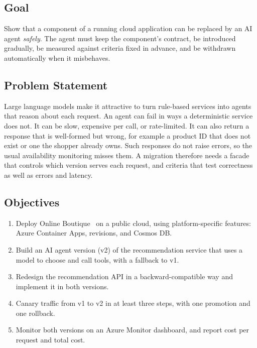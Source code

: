 \documentclass[conference]{IEEEtran}
\begin{document}
\subsection{Goal}
Show that a component of a running cloud application can be replaced by an
AI agent \emph{safely}. The agent must keep the component's contract, be
introduced gradually, be measured against criteria fixed in advance, and be
withdrawn automatically when it misbehaves.

\subsection{Problem Statement}
Large language models make it attractive to turn rule-based services into
agents that reason about each request. An agent can fail in ways a
deterministic service does not. It can be slow, expensive per call, or
rate-limited. It can also return a response that is well-formed but wrong,
for example a product ID that does not exist or one the shopper already
owns. Such responses do not raise errors, so the usual availability
monitoring misses them. A migration therefore needs a facade that controls
which version serves each request, and criteria that test correctness as
well as errors and latency.

\subsection{Objectives}
\begin{enumerate}
\item Deploy Online Boutique~\cite{boutique} on a public cloud, using
platform-specific features: Azure Container Apps, revisions, and Cosmos DB.
\item Build an AI agent version (v2) of the recommendation service that
uses a model to choose and call tools, with a fallback to v1.
\item Redesign the recommendation API in a backward-compatible way and
implement it in both versions.
\item Canary traffic from v1 to v2 in at least three steps, with one
promotion and one rollback.
\item Monitor both versions on an Azure Monitor dashboard, and report cost
per request and total cost.
\end{enumerate}
\end{document}
